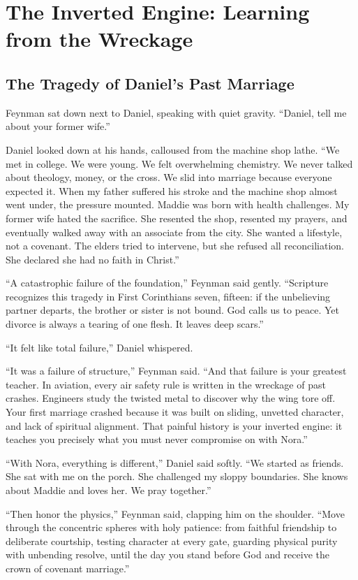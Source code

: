 \documentclass[11pt]{report}
\begin{document}
\chapter{The Inverted Engine: Learning from the Wreckage}

\section{The Tragedy of Daniel's Past Marriage}
Feynman sat down next to Daniel, speaking with quiet gravity. ``Daniel, tell me about your former wife.''

Daniel looked down at his hands, calloused from the machine shop lathe. ``We met in college. We were young. We felt overwhelming chemistry. We never talked about theology, money, or the cross. We slid into marriage because everyone expected it. When my father suffered his stroke and the machine shop almost went under, the pressure mounted. Maddie was born with health challenges. My former wife hated the sacrifice. She resented the shop, resented my prayers, and eventually walked away with an associate from the city. She wanted a lifestyle, not a covenant. The elders tried to intervene, but she refused all reconciliation. She declared she had no faith in Christ.''

``A catastrophic failure of the foundation,'' Feynman said gently. ``Scripture recognizes this tragedy in First Corinthians seven, fifteen: if the unbelieving partner departs, the brother or sister is not bound. God calls us to peace. Yet divorce is always a tearing of one flesh. It leaves deep scars.''

``It felt like total failure,'' Daniel whispered.

``It was a failure of structure,'' Feynman said. ``And that failure is your greatest teacher. In aviation, every air safety rule is written in the wreckage of past crashes. Engineers study the twisted metal to discover why the wing tore off. Your first marriage crashed because it was built on sliding, unvetted character, and lack of spiritual alignment. That painful history is your inverted engine: it teaches you precisely what you must never compromise on with Nora.''

``With Nora, everything is different,'' Daniel said softly. ``We started as friends. She sat with me on the porch. She challenged my sloppy boundaries. She knows about Maddie and loves her. We pray together.''

``Then honor the physics,'' Feynman said, clapping him on the shoulder. ``Move through the concentric spheres with holy patience: from faithful friendship to deliberate courtship, testing character at every gate, guarding physical purity with unbending resolve, until the day you stand before God and receive the crown of covenant marriage.''
\end{document}
